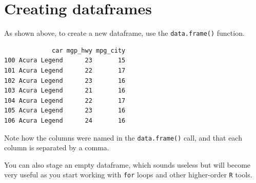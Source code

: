 \documentclass[
]{book}
\newenvironment{Shaded}{\begin{snugshade}}{\end{snugshade}}
\newcommand{\DecValTok}[1]{\textcolor[rgb]{0.00,0.00,0.81}{#1}}
\newcommand{\FunctionTok}[1]{\textcolor[rgb]{0.00,0.00,0.00}{#1}}
\newcommand{\NormalTok}[1]{#1}
\newcommand{\OtherTok}[1]{\textcolor[rgb]{0.56,0.35,0.01}{#1}}
\newcommand{\SpecialCharTok}[1]{\textcolor[rgb]{0.00,0.00,0.00}{#1}}
\begin{document}
\begin{Shaded}
\end{Shaded}

\hypertarget{creating-dataframes}{%
\section*{Creating dataframes}\label{creating-dataframes}}

As shown above, to create a new dataframe, use the \texttt{data.frame()} function.

\begin{verbatim}
             car mgp_hwy mpg_city
100 Acura Legend      23       15
101 Acura Legend      22       17
102 Acura Legend      23       16
103 Acura Legend      21       16
104 Acura Legend      22       17
105 Acura Legend      23       16
106 Acura Legend      24       16
\end{verbatim}

Note how the columns were named in the \texttt{data.frame()} call, and that each column is separated by a comma.

You can also stage an empty dataframe, which sounds useless but will become very useful as you start working with \texttt{for} loops and other higher-order \texttt{R} tools.
\end{document}
